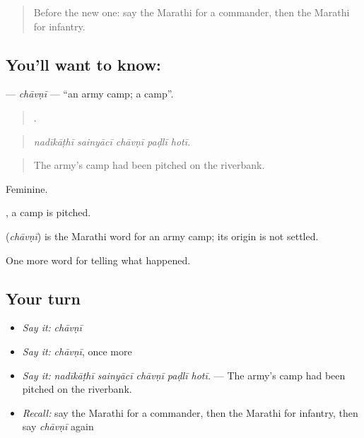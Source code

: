 \label{lesson:MR-C330-chavni}



\begin{quote}
Before the new one: say the Marathi for a commander, then the Marathi for infantry.
\end{quote}

\subsection*{You'll want to know: }
\textbf{} — \emph{chāvṇī} — \textquotedblleft{}an army camp; a camp\textquotedblright{}.

\begin{quote}
    .
\end{quote}

\begin{quote}
\emph{nadīkāṭhī sainyācī chāvṇī paḍlī hotī.}
\end{quote}

\begin{quote}
The army's camp had been pitched on the riverbank.
\end{quote}

Feminine.

 , a camp is pitched.

\begin{cousinweb}
\textbf{} (\emph{chāvṇī}) is the Marathi word for an army camp; its origin is not settled.
\end{cousinweb}

\begin{grammarlens}[title={What you've built}]
One more word for telling what happened.
\end{grammarlens}

\subsection*{Your turn}
\begin{itemize}
\raggedright
  \item \emph{Say it:} \emph{chāvṇī}
  \item \emph{Say it:} \emph{chāvṇī}, once more
  \item \emph{Say it:} \emph{nadīkāṭhī sainyācī chāvṇī paḍlī hotī.} — The army's camp had been pitched on the riverbank.
  \item \emph{Recall:} say the Marathi for a commander, then the Marathi for infantry, then say \emph{chāvṇī} again
\end{itemize}

